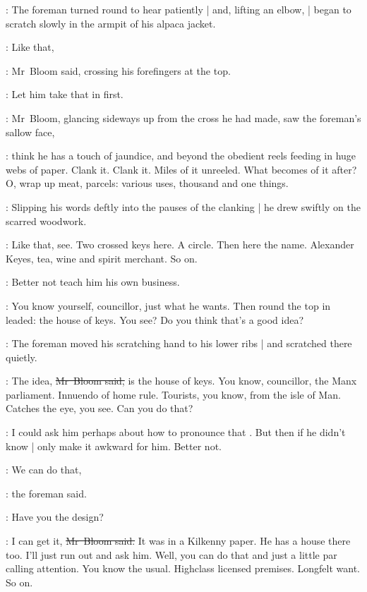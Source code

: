 :
The foreman turned round to hear patiently |
and, lifting an elbow, |
began to scratch slowly in the armpit of his alpaca jacket.

\Bloom:
Like that,

:
Mr~Bloom said,
crossing his forefingers at the top.

\BloomInt:
Let him take that in first.

:
Mr~Bloom,
glancing sideways up from the cross he had made,
saw the foreman's sallow face,

\BloomInt:
think he has a touch of jaundice,
and beyond
the obedient reels feeding in huge webs of paper.
Clank it.
Clank it.
Miles of it unreeled.
What becomes of it after?
O, wrap up meat, parcels:
various uses,
thousand and one things.

:
Slipping his words deftly into the pauses of the clanking |
he drew swiftly
on the scarred woodwork.



\Bloom:
Like that, see.
Two crossed keys here.
A circle.
Then here the name.
Alexander Keyes,
tea, wine and spirit merchant.
So on.

\BloomInt:
Better not teach him his own business.

\Bloom:
You know yourself, councillor,
just what he wants.
Then round the top in leaded:
the house of keys.
You see?
Do you think that's a good idea?

:
The foreman moved his scratching hand to his lower ribs |
and scratched there quietly.

\Bloom:
The idea,
\sout{Mr~Bloom said,}
is the house of keys.
You know, councillor,
the Manx parliament.
Innuendo of home rule.
Tourists, you know, from the isle of Man.
Catches the eye, you see.
Can you do that?

\BloomInt:
I could ask him perhaps about how to pronounce that .
But then if he didn't know |
only make it awkward for him.
Better not.

\foreman:
We can do that,

:
the foreman said.

\foreman:
Have you the design?

\Bloom:
I can get it,
\sout{Mr~Bloom said.}
It was in a Kilkenny paper.
He has a house there too.
I'll just run out and ask him.
Well, you can do that and just a little par calling attention.
You know the usual.
Highclass licensed premises.
Longfelt want.
So on.

